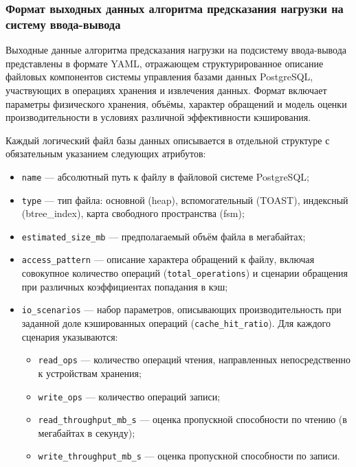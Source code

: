 

\subsubsection{Формат выходных данных алгоритма предсказания нагрузки на систему ввода-вывода}

Выходные данные алгоритма предсказания нагрузки на подсистему ввода-вывода представлены в формате YAML, отражающем структурированное описание файловых компонентов системы управления базами данных PostgreSQL, участвующих в операциях хранения и извлечения данных. Формат включает параметры физического хранения, объёмы, характер обращений и модель оценки производительности в условиях различной эффективности кэширования.

Каждый логический файл базы данных описывается в отдельной структуре с обязательным указанием следующих атрибутов:
\begin{itemize}
    \item \texttt{name} --- абсолютный путь к файлу в файловой системе PostgreSQL;
    \item \texttt{type} --- тип файла: основной (heap), вспомогательный (TOAST), индексный (btree\_index), карта свободного пространства (fsm);
    \item \texttt{estimated\_size\_mb} --- предполагаемый объём файла в мегабайтах;
    \item \texttt{access\_pattern} --- описание характера обращений к файлу, включая совокупное количество операций (\texttt{total\_operations}) и сценарии обращения при различных коэффициентах попадания в кэш;
    \item \texttt{io\_scenarios} --- набор параметров, описывающих производительность при заданной доле кэшированных операций (\texttt{cache\_hit\_ratio}). Для каждого сценария указываются:
    \begin{itemize}
        \item \texttt{read\_ops} --- количество операций чтения, направленных непосредственно к устройствам хранения;
        \item \texttt{write\_ops} --- количество операций записи;
        \item \texttt{read\_throughput\_mb\_s} --- оценка пропускной способности по чтению (в мегабайтах в секунду);
        \item \texttt{write\_throughput\_mb\_s} --- оценка пропускной способности по записи.
    \end{itemize}
\end{itemize}

